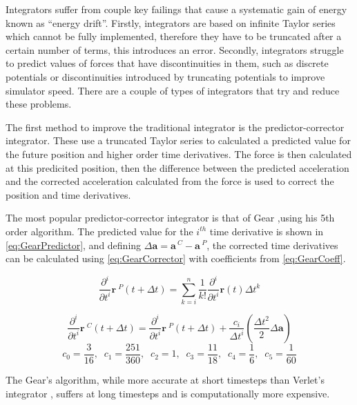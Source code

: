 \message{ !name(main.tex)}\documentclass[12pt]{UoAthesis}
\begin{document}
Integrators suffer from couple key failings that cause a systematic
gain of energy known as ``energy drift''. Firstly, integrators are
based on infinite Taylor series which cannot be fully implemented,
therefore they have to be truncated after a certain number of terms,
this introduces an error. Secondly, integrators struggle to predict
values of forces that have discontinuities in them, such as discrete
potentials or discontinuities introduced by truncating potentials to
improve simulator speed.  There are a couple of types of integrators
that try and reduce these problems.

The first method to improve the traditional integrator is the
predictor-corrector integrator. These use a truncated Taylor series
to calculated a predicted value for the future position and higher
order time derivatives. The force is then calculated at this
predicited position, then the difference between the predicted
acceleration and the corrected acceleration calculated from the force
is used to correct the position and time derivatives.

The most popular predictor-corrector integrator is that of Gear
\cite{Gear1971},using his 5th order algorithm. The predicted value for
the $i^{th}$ time derivative is shown in \eqref{eq:GearPredictor}, and
defining $\Delta \mathbf{a} = \mathbf{a}\,^{C} - \mathbf{a}\,^{P}$, the
corrected time derivatives can be calculated using
\eqref{eq:GearCorrector} with coefficients from \eqref{eq:GearCoeff}.

\begin{equation} 
  \frac{\partial^{i}}{\partial t^{i}} \mathbf{r}\:^{P}(t+\Delta t)
  =\sum^{n}_{k=i} \frac{1}{k!}\frac{\partial^{i} }{\partial t^{i}}
  \mathbf{r}(t) \Delta t^{k} 
  \label{eq:GearPredictor} 
\end{equation}

\begin{equation} 
  \frac{\partial^{i}}{\partial t^{i}} \mathbf{r}\:^{C}(t+\Delta t)
  =\frac{\partial^{i} }{\partial t^{i}} \mathbf{r}\:^{P}(t+\Delta t)
  +\frac{c_i}{\Delta t^i} \left(\frac{\Delta t^2}{2}\Delta \mathbf{a}\right)
  \label{eq:GearCorrector} \end{equation} \begin{equation} c_0 =
  \frac{3}{16},\;\;c_1 = \frac{251}{360},\;\; c_2 = 1,\;\; c_3 =
  \frac{11}{18},\;\; c_4 =
  \frac{1}{6},\;\; c_5 = \frac{1}{60} \label{eq:GearCoeff} 
\end{equation}

The Gear's algorithm, while more accurate at short timesteps than Verlet's
integrator \cite{Haile1997}, suffers at long timesteps and is computationally
more expensive.
\end{document}
